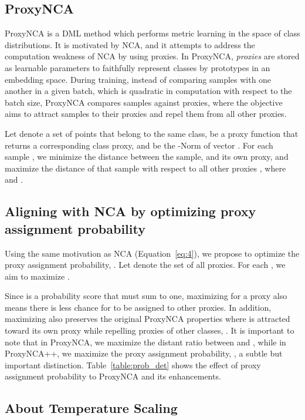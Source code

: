 \documentclass[runningheads]{llncs}
\begin{document}
\subsection{ProxyNCA}
\label{sec:proxynca}
ProxyNCA is a DML method which performs metric learning in the space of class distributions. It is motivated by NCA, and it attempts to address the computation weakness of NCA by using proxies. In ProxyNCA, \emph{proxies} are stored as learnable parameters to faithfully represent classes by prototypes in an embedding space. During training, instead of comparing samples with one another in a given batch, which is quadratic in computation with respect to the batch size, ProxyNCA compares samples against proxies, where the objective aims to attract samples to their proxies and repel them from all other proxies. 

Let  denote a set of points that belong to the same class,  be a proxy function that returns a corresponding class proxy, and  be the -Norm of vector . For each sample , we minimize the distance   between the sample,  and its own proxy,  and maximize the distance   of that sample with respect to all other proxies , where  and .



\subsection{Aligning with NCA by optimizing proxy assignment probability}

Using the same motivation as NCA (Equation~\ref{eq:4}), we propose to optimize the proxy assignment probability, . Let   denote the set of all proxies. For each , we aim to maximize .



Since  is a probability score that must sum to one, maximizing  for a proxy also means there is less chance for  to be assigned to other proxies. In addition, maximizing  also preserves the original ProxyNCA properties where  is attracted toward its own proxy  while repelling proxies of other classes, . It is important to note that in ProxyNCA, we maximize the distant ratio between  and , while in ProxyNCA++, we maximize the proxy assignment probability, , a subtle but important distinction. Table~\ref{table:prob_det} shows the effect of proxy assignment probability to ProxyNCA and its enhancements.

\subsection{About Temperature Scaling}
\end{document}
